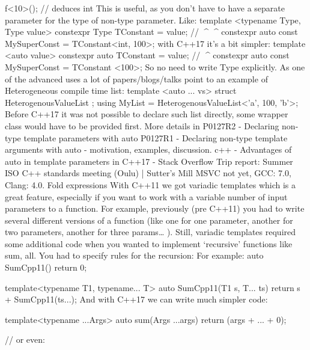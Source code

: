 f<10>();               // deduces int
This is useful, as you don’t have to have a separate parameter for the type of non-type parameter. Like:
template <typename Type, Type value> constexpr Type TConstant = value;
                // ^^^^                        ^^^^  
constexpr auto const MySuperConst = TConstant<int, 100>;
with C++17 it’s a bit simpler:
template <auto value> constexpr auto TConstant = value;
                             // ^^^^
constexpr auto const MySuperConst = TConstant <100>;
So no need to write Type explicitly.
As one of the advanced uses a lot of papers/blogs/talks point to an example of Heterogeneous compile time list:
template <auto ... vs> struct HeterogenousValueList {};
using MyList = HeterogenousValueList<'a', 100, 'b'>;
Before C++17 it was not possible to declare such list directly, some wrapper class would have to be provided first.
More details in 
P0127R2 - Declaring non-type template parameters with auto
P0127R1 - Declaring non-type template arguments with auto - motivation, examples, discussion.
c++ - Advantages of auto in template parameters in C++17 - Stack Overflow
Trip report: Summer ISO C++ standards meeting (Oulu) | Sutter’s Mill
MSVC not yet, GCC: 7.0, Clang: 4.0.
Fold expressions
With C++11 we got variadic templates which is a great feature, especially if you want to work with a variable number of input parameters to a function. For example, previously (pre C++11) you had to write several different versions of a function (like one for one parameter, another for two parameters, another for three params… ).
Still, variadic templates required some additional code when you wanted to implement ‘recursive’ functions like sum, all. You had to specify rules for the recursion:
For example:
auto SumCpp11(){
    return 0;
}

template<typename T1, typename... T>
auto SumCpp11(T1 s, T... ts){
    return s + SumCpp11(ts...);
}
And with C++17 we can write much simpler code:

template<typename ...Args> auto sum(Args ...args) 
{ 
    return (args + ... + 0); 
}

// or even:

